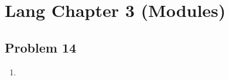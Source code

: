 \documentclass[Lang.tex]{subfiles}
\begin{document}
\section*{Lang Chapter 3 (Modules)}

\subsection{Problem 14}

\begin{enumerate}
	\item 
\end{enumerate}
\end{document}
